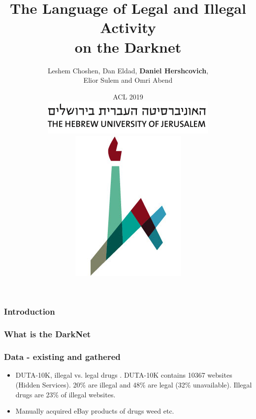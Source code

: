 \documentclass[t,xcolor={svgnames,table}]{beamer}
\begin{document}
\title[]{The Language of Legal and Illegal Activity \\ on the Darknet}
\author[Daniel Hershcovich]{Leshem Choshen, Dan Eldad, \textbf{Daniel Hershcovich}, \\
Elior Sulem and Omri Abend }
\date[]{ACL 2019 \\
	\hspace{0.5cm}
\includegraphics[width=.5\textwidth]{huji_banner.png}
\includegraphics[width=.1\textwidth]{huji_logo.jpg}}

\begin{frame}
\titlepage
\end{frame}

\begin{frame}
\frametitle{Introduction}
\end{frame}

{%
\begin{frame}
	\frametitle{What is the DarkNet}
\end{frame}
}
\begin{frame}
	\frametitle{Data - existing and gathered}
	\begin{itemize}
		\item DUTA-10K, illegal vs. legal drugs \cite{AlNabki19}.
		DUTA-10K contains 10367 websites (Hidden Services).
		20\% are illegal and 48\% are legal (32\% unavailable).
		Illegal drugs are 23\% of illegal websites.
		\item Manually acquired eBay products of drugs weed etc.
	\end{itemize}
\end{frame}
\end{document}
